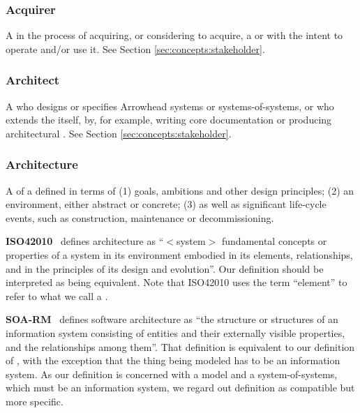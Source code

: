 {

\newcommand{\GlossaryEntry}[3][]{\subsubsection*{#3\IfStrEq{#1}{}{}{ {\normalfont \textit{#1}}}}\label{sec:glossary:#2}}
\newcommand{\GlossaryNote}[2]{\begin{minipage}[b]{\dimexpr\linewidth-0.5cm\relax}\vspace*{0.33cm}\footnotesize{\textbf{#1}\ #2}\end{minipage}}

\GlossaryEntry{acquirer}{Acquirer}
A  in the process of acquiring, or considering to acquire, a  or  with the intent to operate and/or use it.
See Section \ref{sec:concepts:stakeholder}.

\GlossaryEntry{architect}{Architect}
A  who designs or specifies Arrowhead systems or systems-of-systems, or who extends the  itself, by, for example, writing core documentation or producing architectural .
See Section \ref{sec:concepts:stakeholder}.

\GlossaryEntry{architecture}{Architecture}
A  of a  defined in terms of (1) goals, ambitions and other design principles; (2) an environment, either abstract or concrete; (3) as well as significant life-cycle events, such as construction, maintenance or decommissioning.

	\GlossaryNote{ISO42010}{
		defines architecture as ``$<$system$>$ fundamental concepts or properties of a system in its environment embodied in its elements, relationships, and in the principles of its design and evolution''.
		Our definition should be interpreted as being equivalent.
		Note that ISO42010 uses the term ``element'' to refer to what we call a \textit{ \GlossaryHyperRef{entity}{entity}}.
	}

	\GlossaryNote{SOA-RM}{
		defines software architecture as ``the structure or structures of an information system consisting of entities and their externally visible properties, and the relationships among them''.
		That definition is equivalent to our definition of \GlossaryHyperRef{model}{model}, with the exception that the thing being modeled has to be an information system.
		As our definition is concerned with a model and a system-of-systems, which must be an information system, we regard out definition as compatible but more specific.
	}

}
